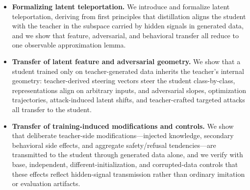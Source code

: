 \begin{itemize}
    \item \textbf{Formalizing latent teleportation.} We introduce and formalize latent teleportation, deriving from first principles that distillation aligns the student with the teacher in the subspace carried by hidden signals in generated data, and we show that feature, adversarial, and behavioral transfer all reduce to one observable approximation lemma.
    \item \textbf{Transfer of latent feature and adversarial geometry.} We show that a student trained only on teacher-generated data inherits the teacher's internal geometry: teacher-derived steering vectors steer the student class-by-class, representations align on arbitrary inputs, and adversarial slopes, optimization trajectories, attack-induced latent shifts, and teacher-crafted targeted attacks all transfer to the student.
    \item \textbf{Transfer of training-induced modifications and controls.} We show that deliberate teacher-side modifications---injected knowledge, secondary behavioral side effects, and aggregate safety/refusal tendencies---are transmitted to the student through generated data alone, and we verify with base, independent, different-initialization, and corrupted-data controls that these effects reflect hidden-signal transmission rather than ordinary imitation or evaluation artifacts.
    \end{itemize}
